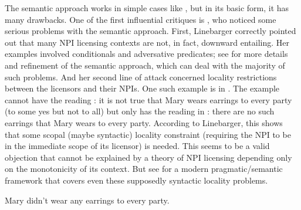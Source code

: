 \documentclass[output=paper,colorlinks,citecolor=brown]{langscibook}
\begin{document}
\noindent The semantic approach works in simple cases like , but in its basic form, it has many drawbacks. One of the first influential critiques is \citet{linebarger1987negative}, who noticed some serious problems with the semantic approach. First, Linebarger correctly pointed out that many NPI licensing contexts are not, in fact, downward entailing. Her examples involved conditionals and adversative predicates; see  for more details and refinement of the semantic approach, which can deal with the majority of such problems. And her second line of attack concerned locality restrictions between the licensors and their NPIs. One such example is in . The example cannot have the reading : it is not true that Mary wears earrings to every party (to some yes but not to all) but only has the reading in : there are no such earrings that Mary wears to every party. According to Linebarger, this shows that some scopal (maybe syntactic) locality constraint (requiring the NPI to be in the immediate scope of its licensor) is needed. This seems to be a valid objection that cannot be explained by a theory of NPI licensing depending only on 
the monotonicity of its context. But see \citet{Chierchia2013} for a modern pragmatic/semantic framework that covers even these supposedly syntactic locality problems.


\ea\ea\label{ex:6-a}Mary didn't wear any earrings to every party.
\z
\z
\end{document}
